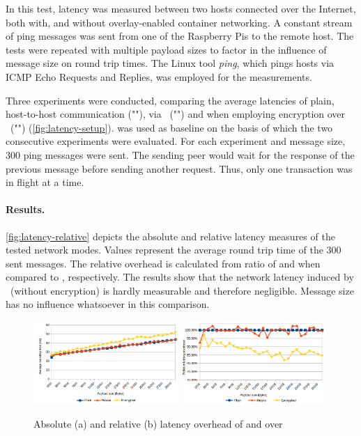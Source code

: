 In this test, latency was measured between two hosts connected over the Internet, both with, and without overlay-enabled container networking. A constant stream of ping messages was sent from one of the Raspberry Pis to the remote host. The tests were repeated with multiple payload sizes to factor in the influence of message size on round trip times. The Linux tool \emph{ping}, which pings hosts via ICMP Echo Requests and Replies, was employed for the measurements. 

Three experiments were conducted, comparing the average latencies of plain, host-to-host communication (""), via \wnet\ ("") and when employing encryption over \wnet\ ("") (\cf \autoref{fig:latency-setup}).  was used as baseline on the basis of which the two consecutive experiments were evaluated. For each experiment and message size, 300 ping messages were sent. The sending peer would wait for the response of the previous message before sending another request. Thus, only one transaction was in flight at a time.


\paragraph{Results.} 
\autoref{fig:latency-relative} depicts the absolute and relative latency measures of the tested network modes. Values represent the average round trip time of the 300 sent messages. The relative overhead is calculated from ratio of  and  when compared to , respectively. The results show that the network latency induced by \wnet\ (without encryption) is hardly measurable and therefore negligible. Message size has no influence whatsoever in this comparison. 


\begin{figure}[htpb]
  \centering
  \includegraphics[width=0.49\textwidth]{figures/latency-absolute}
  \includegraphics[width=0.49\textwidth]{figures/latency-relative}
  \caption[Latency overhead]{Absolute (a) and relative (b) latency overhead of  and  over }\label{fig:latency-relative}
\end{figure}

